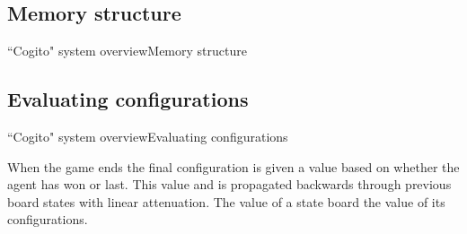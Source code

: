 \subsection{Memory structure}
\begin{frame}{``Cogito" system overview}{Memory structure}
     
\end{frame}




\subsection{Evaluating configurations}
\begin{frame}{``Cogito" system overview}{Evaluating configurations}

When the game ends the final configuration is given a value based on whether the 
agent has won or last. This value and is propagated backwards through previous
board states with linear attenuation. The value of a state board the value 
of its configurations.

\end{frame}

